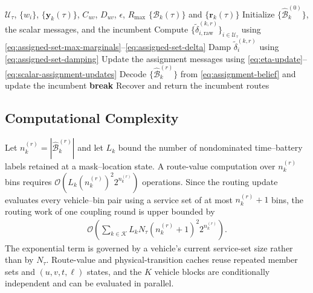 \begin{algorithm}
\caption{Vehicle Assignment--Routing Message Passing}
\label{alg:assigned-set-vehicle-mp}
\begin{algorithmic}[1]
\Require $\mathcal U_\tau$, $\{w_i\}$, $\{\mathbf y_k(\tau)\}$, $C_{uv}$, $D_{uv}$, $\epsilon$, $R_{\max}$
\Ensure $\{\mathcal B_k(\tau)\}$ and $\{\mathbf r_k(\tau)\}$
\State Initialize $\{\widehat{\mathcal B}_k^{(0)}\}$, the scalar messages, and the incumbent
  \State Compute $\{\widetilde\delta_{i,\mathrm{raw}}^{(k,r)}\}_{i\in\mathcal U_\tau}$ using \eqref{eq:assigned-set-max-marginals}--\eqref{eq:assigned-set-delta}
 \EndFor
 \State Damp $\widetilde\delta_i^{(k,r)}$ using \eqref{eq:assigned-set-damping}
 \State Update the assignment messages using \eqref{eq:eta-update}--\eqref{eq:scalar-assignment-updates}
 \State Decode $\{\widehat{\mathcal B}_k^{(r)}\}$ from \eqref{eq:assignment-belief} and update the incumbent
  \State \textbf{break}
 \EndIf
\EndFor
\State Recover and return the incumbent routes
\end{algorithmic}
\end{algorithm}

\subsection{Computational Complexity}
\label{sec:complexity}

Let $n_k^{(r)}=|\widehat{\mathcal B}_k^{(r)}|$ and let $L_k$ bound the number of nondominated time--battery labels retained at a mask--location state. A route-value computation over $n_k^{(r)}$ bins requires $\mathcal O(L_k(n_k^{(r)})^2 2^{n_k^{(r)}})$ operations. Since the routing update evaluates every vehicle--bin pair using a service set of at most $n_k^{(r)}+1$ bins, the routing work of one coupling round is upper bounded by
\begin{align}
 \mathcal O\!\left(\sum_{k\in\mathcal K}L_kN_\tau
 \left(n_k^{(r)}+1\right)^2 2^{n_k^{(r)}}\right).
 \label{eq:assigned-set-routing-complexity}
\end{align}
The exponential term is governed by a vehicle's current service-set size rather than by $N_\tau$. Route-value and physical-transition caches reuse repeated member sets and $(u,v,t,\ell)$ states, and the $K$ vehicle blocks are conditionally independent and can be evaluated in parallel.
